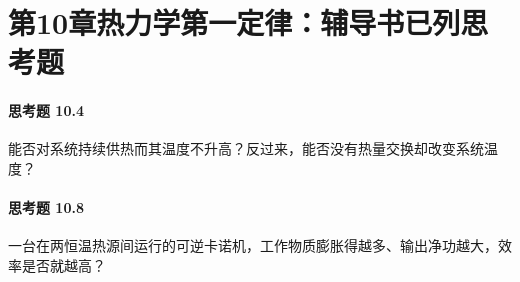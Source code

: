 \section*{第10章\quad 热力学第一定律：辅导书已列思考题}
\paragraph{思考题 10.4}
能否对系统持续供热而其温度不升高？反过来，能否没有热量交换却改变系统温度？

\paragraph{思考题 10.8}
一台在两恒温热源间运行的可逆卡诺机，工作物质膨胀得越多、输出净功越大，效率是否就越高？
